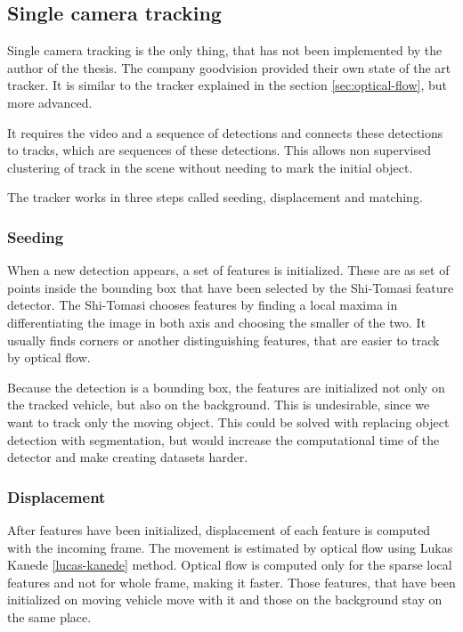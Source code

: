 \documentclass[a4paper,12pt,titlepage, twoside]{article}
\numberwithin{figure}{section}
\begin{document}
\subsection{Single camera tracking}

Single camera tracking is the only thing, that has not been implemented by the author of the thesis. The company goodvision provided their own state of the art tracker. It is similar to the tracker explained in the section \ref{sec:optical-flow}, but more advanced.

It requires the video and a sequence of detections and connects these detections to tracks, which are sequences of these detections. This allows non supervised clustering of track in the scene without needing to mark the initial object. 

The tracker works in three steps called seeding, displacement and matching. 

\subsubsection{Seeding}
When a new detection appears, a set of features is initialized. These are as set of points inside the bounding box that have been selected by the Shi-Tomasi \cite{shi-tomasi} feature detector. The Shi-Tomasi chooses features by finding a local maxima in differentiating the image in both axis and choosing the smaller of the two. It usually finds corners or another distinguishing features, that are easier to track by optical flow. 

Because the detection is a bounding box, the features are initialized not only on the tracked vehicle, but also on the background. This is undesirable, since we want to track only the moving object. This could be solved with replacing object detection with segmentation, but would increase the computational time of the detector and make creating datasets harder.

\subsubsection{Displacement}
After features have been initialized, displacement of each feature is computed with the incoming frame. The movement is estimated by optical flow using Lukas Kanede \ref{lucas-kanede} method. Optical flow is computed only for the sparse local features and not for whole frame, making it faster. Those features, that have been initialized on moving vehicle move with it and those on the background stay on the same place. 
\end{document}
